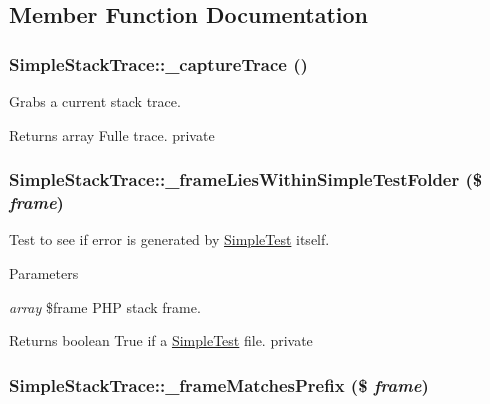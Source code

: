 \subsection{Member Function Documentation}
\hypertarget{class_simple_stack_trace_acf1e0c12244f696aa14d6073fd452def}{
\subsubsection[{\_\-captureTrace}]{\setlength{\rightskip}{0pt plus 5cm}SimpleStackTrace::\_\-captureTrace ()}}
\label{class_simple_stack_trace_acf1e0c12244f696aa14d6073fd452def}
Grabs a current stack trace. \begin{DoxyReturn}{Returns}
array Fulle trace.  private 
\end{DoxyReturn}
\hypertarget{class_simple_stack_trace_a3dfd46c09d9234667d42ef0ed6eadeda}{
\subsubsection[{\_\-frameLiesWithinSimpleTestFolder}]{\setlength{\rightskip}{0pt plus 5cm}SimpleStackTrace::\_\-frameLiesWithinSimpleTestFolder (\$ {\em frame})}}
\label{class_simple_stack_trace_a3dfd46c09d9234667d42ef0ed6eadeda}
Test to see if error is generated by \hyperlink{class_simple_test}{SimpleTest} itself. 
\begin{DoxyParams}{Parameters}
\item[{\em array}]\$frame PHP stack frame. \end{DoxyParams}
\begin{DoxyReturn}{Returns}
boolean True if a \hyperlink{class_simple_test}{SimpleTest} file.  private 
\end{DoxyReturn}
\hypertarget{class_simple_stack_trace_a0789e56a3e37b581790028a929ffa93e}{
\subsubsection[{\_\-frameMatchesPrefix}]{\setlength{\rightskip}{0pt plus 5cm}SimpleStackTrace::\_\-frameMatchesPrefix (\$ {\em frame})}}
